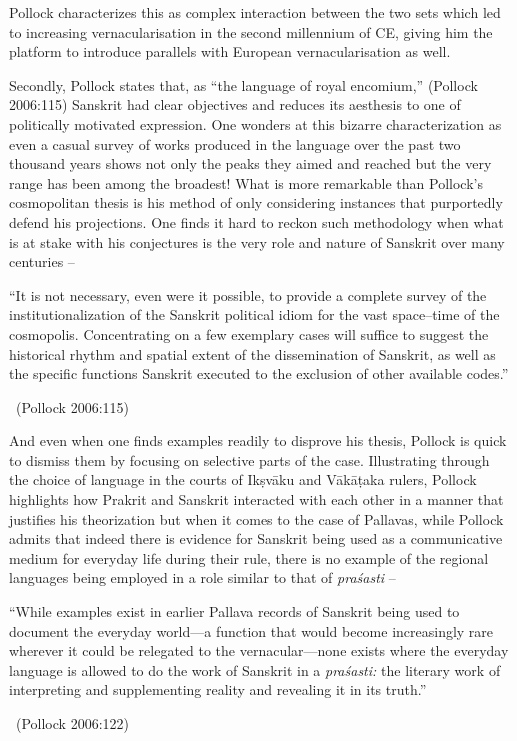 Pollock characterizes this as complex interaction between the two sets which led to increasing vernacularisation in the second millennium of CE, giving him the platform to introduce parallels with European vernacularisation as well.

Secondly, Pollock states that, as “the language of royal encomium,” (Pollock 2006:115) Sanskrit had clear objectives and reduces its aesthesis to one of politically motivated expression. One wonders at this bizarre characterization as even a casual survey of works produced in the language over the past two thousand years shows not only the peaks they aimed and reached but the very range has been among the broadest! What is more remarkable than Pollock’s cosmopolitan thesis is his method of only considering instances that purportedly defend his projections. One finds it hard to reckon such methodology when what is at stake with his conjectures is the very role and nature of Sanskrit over many centuries –

\begin{myquote}
“It is not necessary, even were it possible, to provide a complete survey of the institutionalization of the Sanskrit political idiom for the vast space–time of the cosmopolis. Concentrating on a few exemplary cases will suffice to suggest the historical rhythm and spatial extent of the dissemination of Sanskrit, as well as the specific functions Sanskrit executed to the exclusion of other available codes.” 

~\hfill (Pollock 2006:115)
\end{myquote}

And even when one finds examples readily to disprove his thesis, Pollock is quick to dismiss them by focusing on selective parts of the case. Illustrating through the choice of language in the courts of Ikṣvāku and Vākāṭaka rulers, Pollock highlights how Prakrit and Sanskrit interacted with each other in a manner that justifies his theorization but when it comes to the case of Pallavas, while Pollock admits that indeed there is evidence for Sanskrit being used as a communicative medium for everyday life during their rule, there is no example of the regional languages being employed in a role similar to that of \textit{praśasti} –

\begin{myquote}
“While examples exist in earlier Pallava records of Sanskrit being used to document the everyday world—a function that would become increasingly rare wherever it could be relegated to the vernacular—none exists where the everyday language is allowed to do the work of Sanskrit in a \textit{praśasti:} the literary work of interpreting and supplementing reality and revealing it in its truth.” 

~\hfill (Pollock 2006:122)
\end{myquote}

